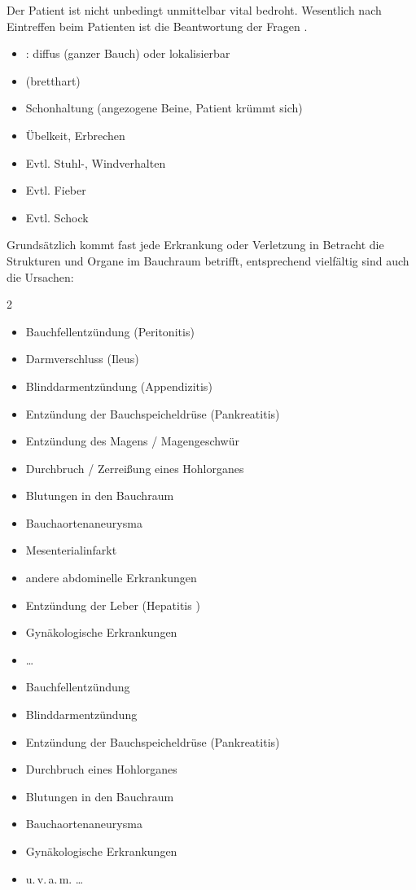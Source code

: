 {{Der Patient ist nicht unbedingt unmittelbar vital
bedroht. Wesentlich nach Eintreffen beim Patienten ist die
Beantwortung der Fragen .

} 
{
\begin{itemize}
  \item {}: diffus (ganzer Bauch) oder
  lokalisierbar
  \item {} (bretthart)
  \item Schonhaltung  (angezogene Beine, Patient
  krümmt sich)
  \item Übelkeit, Erbrechen
  \item Evtl. Stuhl-, Windverhalten
  \item Evtl. Fieber
  \item Evtl. Schock
\end{itemize}
}{}{}{}




{%
Grundsätzlich kommt fast jede Erkrankung oder Verletzung in
Betracht die Strukturen und Organe im Bauchraum betrifft,
entsprechend vielfältig sind auch die Ursachen: 

\begin{multicols}{2}
\FormatTable
\begin{itemize}
  \item Bauchfellentzündung (Peritonitis)
  \item Darmverschluss (Ileus)
  \item Blinddarmentzündung (Appendizitis)
  \item Entzündung der Bauchspeicheldrüse  (Pankreatitis)
  \item Entzündung des Magens / Magengeschwür
  \item Durchbruch / Zerreißung eines Hohlorganes
  \item Blutungen in den Bauchraum
  \item Bauchaortenaneurysma
  \item Mesenterialinfarkt
  \item andere abdominelle Erkrankungen
  \item Entzündung der Leber (Hepatitis )
  \item Gynäkologische Erkrankungen
  \item \ldots
\end{itemize}
\end{multicols}
}{
\begin{itemize}
  \item Bauchfellentzündung 
  \item Blinddarmentzündung 
  \item Entzündung der Bauchspeicheldrüse  (Pankreatitis)
  \item Durchbruch eines Hohlorganes
  \item Blutungen in den Bauchraum
  \item Bauchaortenaneurysma
  \item Gynäkologische Erkrankungen
  \item u.\,v.\,a.\,m. \ldots
\end{itemize}
}{}{}{}






}
